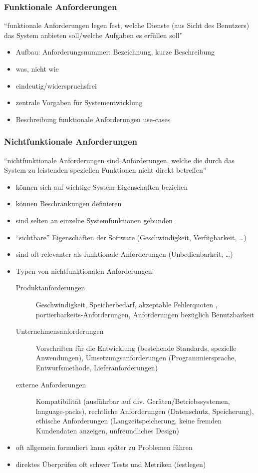 \documentclass[a4paper, 10pt]{article}
\begin{document}
\subsubsection{Funktionale Anforderungen}
\begin{shaded}
``funktionale Anforderungen legen fest, welche Dienste (aus Sicht des Benutzers) das System anbieten soll/welche Aufgaben es erfüllen soll''
\end{shaded}
\begin{itemize}
	\item Aufbau: Anforderungsnummer: Bezeichnung, kurze Beschreibung
	\item was, nicht wie
	\item eindeutig/widerspruchsfrei
	\item zentrale Vorgaben für Systementwicklung
	\item Beschreibung funktionale Anforderungen \follows use-cases
\end{itemize}

\subsubsection{Nichtfunktionale Anforderungen}
\begin{shaded}
"`nichtfunktionale Anforderungen sind Anforderungen, welche die durch das System zu leistenden speziellen Funktionen nicht direkt betreffen"'
\end{shaded}
\begin{itemize}
	\item können sich auf wichtige System-Eigenschaften beziehen
	\item können Beschränkungen definieren
	\item sind selten an einzelne Systemfunktionen gebunden
	\item "`sichtbare"'  Eigenschaften der Software (Geschwindigkeit, Verfügbarkeit, \dots)
	\item sind oft relevanter als funktionale Anforderungen (Unbedienbarkeit, \dots)
	\item Typen von nichtfunktionalen Anforderungen:
	\begin{description}
		\item[Produktanforderungen] Geschwindigkeit, Speicherbedarf, akzeptable Fehlerquoten , portierbarkeits-Anforderungen, Anforderungen bezüglich Benutzbarkeit
		\item[Unternehmensanforderungen] Vorschriften für die Entwicklung (bestehende Standards, spezielle Anwendungen), Umsetzungsanforderungen (Programmiersprache, Entwurfsmethode, Lieferanforderungen)
		\item[externe Anforderungen] Kompatibilität (ausführbar auf div. Geräten/Betriebssystemen, language-packs), rechtliche Anforderungen (Datenschutz, Speicherung), ethische Anforderungen (Langzeitspeicherung, keine fremden Kundendaten anzeigen, unfreundliches Design)
	\end{description}
	\item oft allgemein formuliert \follows kann später zu Problemen führen
	\item direktes Überprüfen oft schwer \follows Tests und Metriken (festlegen)
\end{itemize}
\end{document}
